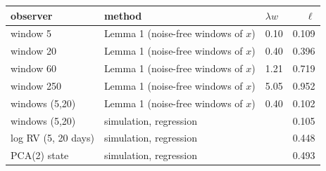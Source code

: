 \begin{tabular}{lllr}\toprule observer & method & $\lambda w$ & $\ell$\\\midrule
window 5 & Lemma 1 (noise-free windows of $x$) & 0.10 & 0.109\\
window 20 & Lemma 1 (noise-free windows of $x$) & 0.40 & 0.396\\
window 60 & Lemma 1 (noise-free windows of $x$) & 1.21 & 0.719\\
window 250 & Lemma 1 (noise-free windows of $x$) & 5.05 & 0.952\\
windows (5,20) & Lemma 1 (noise-free windows of $x$) & 0.40 & 0.102\\
windows (5,20) & simulation, regression &  & 0.105\\
log RV (5, 20 days) & simulation, regression &  & 0.448\\
PCA(2) state & simulation, regression &  & 0.493\\
\bottomrule\end{tabular}
